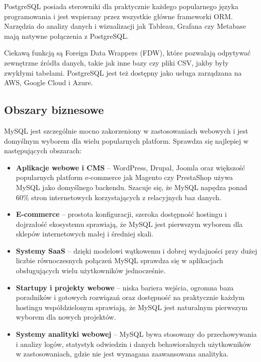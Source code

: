 PostgreSQL posiada sterowniki dla praktycznie każdego popularnego języka
programowania i jest wspierany przez wszystkie główne frameworki ORM. Narzędzia
do analizy danych i wizualizacji jak Tableau, Grafana czy Metabase mają natywne
połączenia z PostgreSQL.

Ciekawą funkcją są Foreign Data Wrappers (FDW), które pozwalają odpytywać
zewnętrzne źródła danych, takie jak inne bazy czy pliki CSV, jakby były
zwykłymi tabelami. PostgreSQL jest też dostępny jako usługa zarządzana na
AWS, Google Cloud i Azure.


\subsection{Obszary biznesowe}

MySQL jest szczególnie mocno zakorzeniony w zastosowaniach webowych i jest
domyślnym wyborem dla wielu popularnych platform. Sprawdza się najlepiej
w następujących obszarach:

\begin{itemize}
    \item \textbf{Aplikacje webowe i CMS} -- WordPress, Drupal, Joomla oraz
    większość popularnych platform e-commerce jak Magento czy PrestaShop
    używa MySQL jako domyślnego backendu. Szacuje się, że MySQL napędza
    ponad 60\% stron internetowych korzystających z relacyjnych baz danych.
    \item \textbf{E-commerce} -- prostota konfiguracji, szeroka dostępność
    hostingu i dojrzałość ekosystemu sprawiają, że MySQL jest pierwszym
    wyborem dla sklepów internetowych małej i średniej skali.
    \item \textbf{Systemy SaaS} -- dzięki modelowi wątkowemu i dobrej
    wydajności przy dużej liczbie równoczesnych połączeń MySQL sprawdza się
    w aplikacjach obsługujących wielu użytkowników jednocześnie.
    \item \textbf{Startupy i projekty webowe} -- niska bariera wejścia,
    ogromna baza poradników i gotowych rozwiązań oraz dostępność na
    praktycznie każdym hostingu współdzielonym sprawiają, że MySQL
    jest naturalnym pierwszym wyborem dla nowych projektów.
    \item \textbf{Systemy analityki webowej} -- MySQL bywa stosowany
    do przechowywania i analizy logów, statystyk odwiedzin i danych
    behawioralnych użytkowników w zastosowaniach, gdzie nie jest wymagana
    zaawansowana analityka.
\end{itemize}

